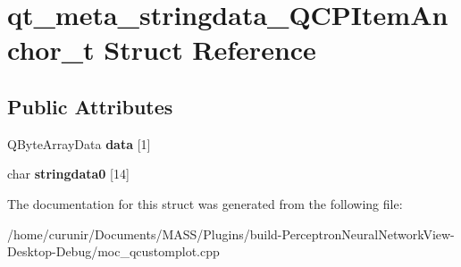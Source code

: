 \hypertarget{structqt__meta__stringdata___q_c_p_item_anchor__t}{}\section{qt\+\_\+meta\+\_\+stringdata\+\_\+\+Q\+C\+P\+Item\+Anchor\+\_\+t Struct Reference}
\label{structqt__meta__stringdata___q_c_p_item_anchor__t}
\subsection*{Public Attributes}
\begin{DoxyCompactItemize}
\item 
Q\+Byte\+Array\+Data {\bfseries data} \mbox{[}1\mbox{]}\hypertarget{structqt__meta__stringdata___q_c_p_item_anchor__t_ab593c041f966a8f093e032b5b552399d}{}\label{structqt__meta__stringdata___q_c_p_item_anchor__t_ab593c041f966a8f093e032b5b552399d}

\item 
char {\bfseries stringdata0} \mbox{[}14\mbox{]}\hypertarget{structqt__meta__stringdata___q_c_p_item_anchor__t_aafbba7dee657bf2d44a9148e9e2c6b48}{}\label{structqt__meta__stringdata___q_c_p_item_anchor__t_aafbba7dee657bf2d44a9148e9e2c6b48}

\end{DoxyCompactItemize}


The documentation for this struct was generated from the following file\+:\begin{DoxyCompactItemize}
\item 
/home/curunir/\+Documents/\+M\+A\+S\+S/\+Plugins/build-\/\+Perceptron\+Neural\+Network\+View-\/\+Desktop-\/\+Debug/moc\+\_\+qcustomplot.\+cpp\end{DoxyCompactItemize}

